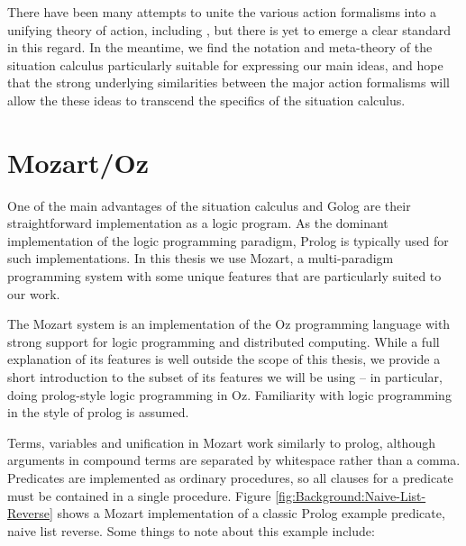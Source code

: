 There have been many attempts to unite the various action formalisms
into a unifying theory of action, including \citep{belleghem95combine_sitcalc_evtcalc,kowalski97reconcile_sitcalc_evtcalc,thielscher06reconcile_sc_fc,thielscher07unifying_action_calculus},
but there is yet to emerge a clear standard in this regard. In the
meantime, we find the notation and meta-theory of the situation calculus
particularly suitable for expressing our main ideas, and hope that
the strong underlying similarities between the major action formalisms
will allow the these ideas to transcend the specifics of the situation
calculus.


\section{Mozart/Oz\label{sec:Background:Mozart/Oz}}

One of the main advantages of the situation calculus and Golog are
their straightforward implementation as a logic program. As the dominant
implementation of the logic programming paradigm, Prolog is typically
used for such implementations. In this thesis we use Mozart, a multi-paradigm
programming system with some unique features that are particularly
suited to our work.

The Mozart system \citep{vanroy99mozart} is an implementation of
the Oz programming language \citep{vanRoyHaridi04ctm} with strong
support for logic programming and distributed computing. While a full
explanation of its features is well outside the scope of this thesis,
we provide a short introduction to the subset of its features we will
be using -- in particular, doing prolog-style logic programming in
Oz. Familiarity with logic programming in the style of prolog is assumed.

Terms, variables and unification in Mozart work similarly to prolog,
although arguments in compound terms are separated by whitespace rather
than a comma. Predicates are implemented as ordinary procedures, so
all clauses for a predicate must be contained in a single procedure.
Figure \ref{fig:Background:Naive-List-Reverse} shows a Mozart implementation
of a classic Prolog example predicate, naive list reverse. Some things
to note about this example include:

